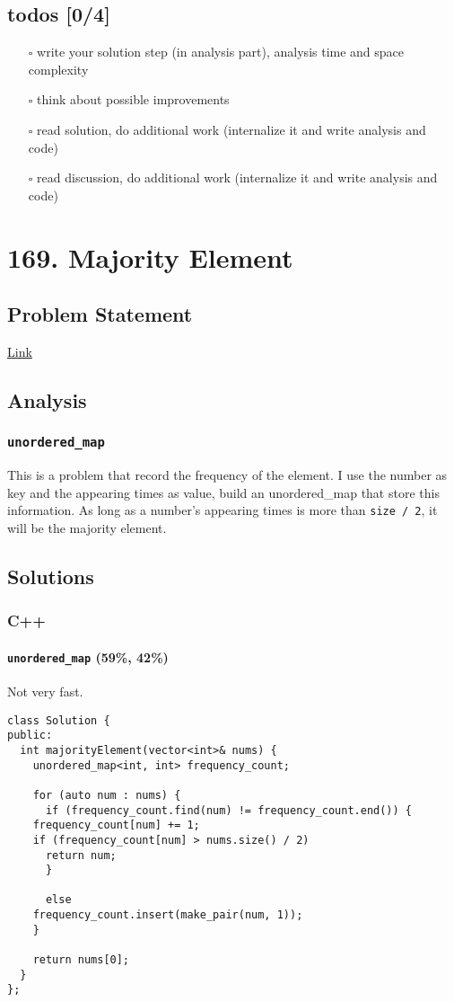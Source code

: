 \documentclass[12pt]{book}
\begin{document}
\section{todos [0/4]}
\label{sec:orgdae47a0}
\begin{itemize}
\item[{$\square$}] write your solution step (in analysis part), analysis time and space complexity
\item[{$\square$}] think about possible improvements
\item[{$\square$}] read solution, do additional work (internalize it and write analysis and code)
\item[{$\square$}] read discussion, do additional work (internalize it and write analysis and code)
\end{itemize}
\chapter{169. Majority Element}
\label{sec:org46dd921}
\section{Problem Statement}
\label{sec:org7105ee2}
\href{https://leetcode.com/problems/majority-element/}{Link}
\section{Analysis}
\label{sec:org0108d38}
\subsection{\texttt{unordered\_map}}
\label{sec:orgba0db61}
This is a problem that record the frequency of the element. I use the number as key and the appearing times as value, build an unordered\_map that store this information. As long as a number's appearing times is more than \texttt{size / 2}, it will be the majority element.
\section{Solutions}
\label{sec:orgaf4ce93}
\subsection{C++}
\label{sec:org9e5ddee}
\subsubsection{\texttt{unordered\_map} (59\%, 42\%)}
\label{sec:org4d59367}
Not very fast.
\begin{verbatim}
class Solution {
public:
  int majorityElement(vector<int>& nums) {
    unordered_map<int, int> frequency_count;

    for (auto num : nums) {
      if (frequency_count.find(num) != frequency_count.end()) {
	frequency_count[num] += 1;
	if (frequency_count[num] > nums.size() / 2)
	  return num;
      }

      else
	frequency_count.insert(make_pair(num, 1));
    }

    return nums[0];
  }
};
\end{verbatim}
\end{document}
